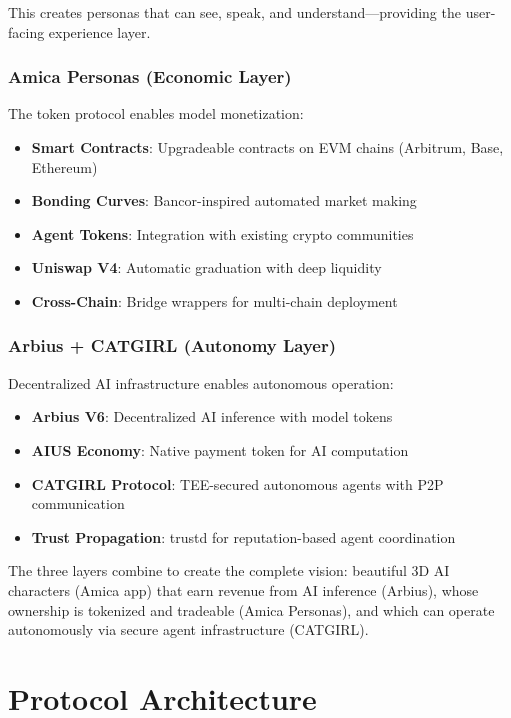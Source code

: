 \documentclass{article}
\begin{document}
This creates personas that can see, speak, and understand—providing the user-facing experience layer.

\subsubsection{Amica Personas (Economic Layer)}

The token protocol enables model monetization:
\begin{itemize}
    \item \textbf{Smart Contracts}: Upgradeable contracts on EVM chains (Arbitrum, Base, Ethereum)
    \item \textbf{Bonding Curves}: Bancor-inspired automated market making
    \item \textbf{Agent Tokens}: Integration with existing crypto communities
    \item \textbf{Uniswap V4}: Automatic graduation with deep liquidity
    \item \textbf{Cross-Chain}: Bridge wrappers for multi-chain deployment
\end{itemize}

\subsubsection{Arbius + CATGIRL (Autonomy Layer)}

Decentralized AI infrastructure enables autonomous operation:
\begin{itemize}
    \item \textbf{Arbius V6}: Decentralized AI inference with model tokens
    \item \textbf{AIUS Economy}: Native payment token for AI computation
    \item \textbf{CATGIRL Protocol}: TEE-secured autonomous agents with P2P communication
    \item \textbf{Trust Propagation}: trustd for reputation-based agent coordination
\end{itemize}

The three layers combine to create the complete vision: beautiful 3D AI characters (Amica app) that earn revenue from AI inference (Arbius), whose ownership is tokenized and tradeable (Amica Personas), and which can operate autonomously via secure agent infrastructure (CATGIRL).

\section{Protocol Architecture}
\end{document}
